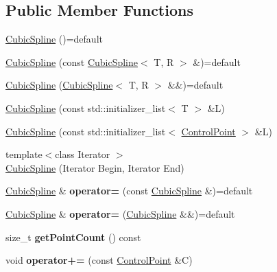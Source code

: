 \subsection*{Public Member Functions}
\begin{DoxyCompactItemize}
\item 
\hyperlink{class_cubic_spline_aa96fa0cae57adc1b3b54ba6c77449bf9}{Cubic\+Spline} ()=default
\item 
\hyperlink{class_cubic_spline_a7dda562cc8c8e21795fae07cd795e34f}{Cubic\+Spline} (const \hyperlink{class_cubic_spline}{Cubic\+Spline}$<$ T, R $>$ \&)=default
\item 
\hyperlink{class_cubic_spline_a60273994d7a74bd9b32710fe85930886}{Cubic\+Spline} (\hyperlink{class_cubic_spline}{Cubic\+Spline}$<$ T, R $>$ \&\&)=default
\item 
\hyperlink{class_cubic_spline_ada95f74924601a63f49e5a9750b26820}{Cubic\+Spline} (const std\+::initializer\+\_\+list$<$ T $>$ \&L)
\item 
\hyperlink{class_cubic_spline_a1585facd63ce5a5a6d792bb74e463530}{Cubic\+Spline} (const std\+::initializer\+\_\+list$<$ \hyperlink{class_cubic_spline_1_1_control_point}{Control\+Point} $>$ \&L)
\item 
{\footnotesize template$<$class Iterator $>$ }\\\hyperlink{class_cubic_spline_a0b0fb22f91f159696773a7c9886917d3}{Cubic\+Spline} (Iterator Begin, Iterator End)
\item 
\hypertarget{class_cubic_spline_a63b02c717562f6188361d1cef7de36a0}{\hyperlink{class_cubic_spline}{Cubic\+Spline} \& {\bfseries operator=} (const \hyperlink{class_cubic_spline}{Cubic\+Spline} \&)=default}\label{class_cubic_spline_a63b02c717562f6188361d1cef7de36a0}

\item 
\hypertarget{class_cubic_spline_a6611d30ab9e2bc9da998da7284cde8a9}{\hyperlink{class_cubic_spline}{Cubic\+Spline} \& {\bfseries operator=} (\hyperlink{class_cubic_spline}{Cubic\+Spline} \&\&)=default}\label{class_cubic_spline_a6611d30ab9e2bc9da998da7284cde8a9}

\item 
\hypertarget{class_cubic_spline_a4b74494e4824a178cc6ee4af3bf4e6d0}{size\+\_\+t {\bfseries get\+Point\+Count} () const }\label{class_cubic_spline_a4b74494e4824a178cc6ee4af3bf4e6d0}

\item 
\hypertarget{class_cubic_spline_a0d6abd3a3216bb408d9623795633c291}{void {\bfseries operator+=} (const \hyperlink{class_cubic_spline_1_1_control_point}{Control\+Point} \&C)}\label{class_cubic_spline_a0d6abd3a3216bb408d9623795633c291}


\end{DoxyCompactItemize}
